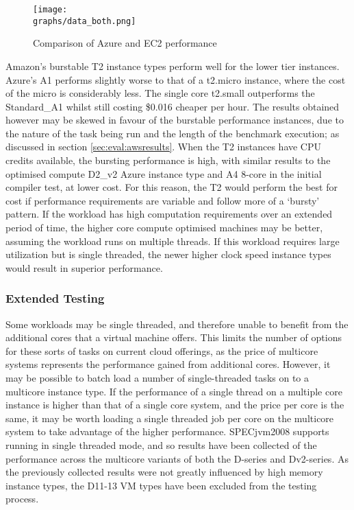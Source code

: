\documentclass{llncs}
\newcommand{\graphs}{../analysis/graphs}
\begin{document}
\begin{figure}[ht]
  \centering
  \texttt{[image: \\graphs/data\_both.png]}
  \caption{Comparison of Azure and EC2 performance}
  \label{fig:bothchart}
\end{figure}

Amazon's burstable T2 instance types perform well for the lower tier instances. Azure's A1 performs slightly worse to that of a t2.micro instance, where the cost of the micro is considerably less. The single core t2.small outperforms the Standard\_A1 whilst still costing \$0.016 cheaper per hour. The results obtained however may be skewed in favour of the burstable performance instances, due to the nature of the task being run and the length of the benchmark execution; as discussed in section \ref{sec:eval:awsresults}. When the T2 instances have CPU credits available, the bursting performance is high, with similar results to the optimised compute D2\_v2 Azure instance type and A4 8-core in the initial compiler test, at lower cost. For this reason, the T2 would perform the best for cost if performance requirements are variable and follow more of a `bursty' pattern. If the workload has high computation requirements over an extended period of time, the higher core compute optimised machines may be better, assuming the workload runs on multiple threads. If this workload requires large utilization but is single threaded, the newer higher clock speed instance types would result in superior performance.

\subsubsection{Extended Testing}\label{sec:eval:extended}

Some workloads may be single threaded, and therefore unable to benefit from the additional cores that a virtual machine offers. This limits the number of options for these sorts of tasks on current cloud offerings, as the price of multicore systems represents the performance gained from additional cores. However, it may be possible to batch load a number of single-threaded tasks on to a multicore instance type. If the performance of a single thread on a multiple core instance is higher than that of a single core system, and the price per core is the same, it may be worth loading a single threaded job per core on the multicore system to take advantage of the higher performance. SPECjvm2008 supports running in single threaded mode\cite{specjvmguide}, and so results have been collected of the performance across the multicore variants of both the D-series and Dv2-series. As the previously collected results were not greatly influenced by high memory instance types, the D11-13 VM types have been excluded from the testing process.
\end{document}
